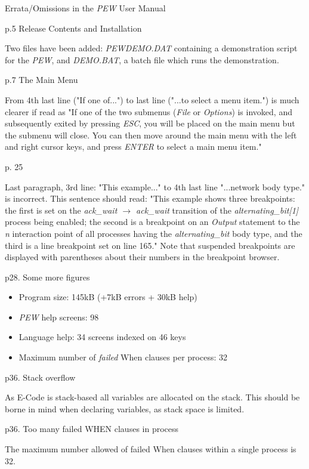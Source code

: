 
\thispagestyle{blank}
{\LARGE Errata/Omissions in the {\em PEW} User Manual}

\mbox{}

{\large p.5 Release Contents and Installation}

\mbox{}

Two files have been added: {\em PEWDEMO.DAT} containing a
demonstration script for the {\em PEW}, and {\em DEMO.BAT}, a batch
file which runs the demonstration.

\mbox{}

{\large p.7 The Main Menu}

\mbox{}

From 4th last line ("If one of...") to last line ("...to select a
menu item.") is much clearer if read as "If one of the two submenus ({\em File} or
{\em Options}) is invoked, and subsequently exited by pressing {\em
ESC}, you will be placed on the main menu but the submenu will close.
You can then move around the main menu with the left and right
cursor keys, and press {\em ENTER} to select a main menu item."

\mbox{}

{\large p. 25 }

\mbox{}

Last paragraph, 3rd line: "This example..." to 4th last line
"...network body type." is incorrect. This sentence should read:
"This example shows three breakpoints: the first is set on the 
{\em ack\_wait $\rightarrow$ ack\_wait} transition of the {\em
alternating\_bit[1]} process being enabled;
the second is a breakpoint on an {\em Output}
statement to the {\em n} interaction point of all processes having
the {\em alternating\_bit} body type, and the third is a line
breakpoint set on line 165." Note that suspended
breakpoints are displayed with parentheses about their numbers in the
breakpoint browser.

\mbox{}

{\large p28. Some more figures}

\begin{itemize}
\item Program size: 145kB (+7kB errors + 30kB help)
\item {\em PEW} help screens: 98
\item Language help: 34 screens indexed on 46 keys
\item Maximum number of {\em failed} When clauses per process: 32
\end{itemize}

\mbox{}

{\large p36. Stack overflow}

\mbox{}

As E-Code is stack-based all variables are allocated on the stack. 
This should be borne in mind when declaring variables, as stack space
is limited.

\mbox{}

{\large p36. Too many failed WHEN clauses in process}

\mbox{}

The maximum number allowed of failed When clauses within a single
process is 32.


